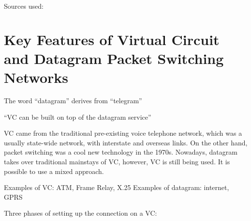 \documentclass[10pt]{report}
\begin{document}
Sources used:
    \cite{slides-lecture-4}
    \cite{kurose}
    \cite{vaughn}




\chapter{Key Features of Virtual Circuit and Datagram Packet Switching
	Networks}


The word ``datagram'' derives from ``telegram'' \cite[p141]{russell}


``VC can be built on top of the datagram service'' \cite[p141]{russell}

VC came from the traditional pre-existing voice telephone network, which was a usually state-wide network, with interstate and overseas links.  On the other hand, packet switching was a cool new technology in the 1970s.  Nowadays, datagram takes over traditional mainstays of VC, however, VC is still being used.  It is possible to use a mixed approach.

Examples of VC: ATM, Frame Relay, X.25
Examples of datagram: internet, GPRS


Three phases of setting up the connection on a VC:
\end{document}

